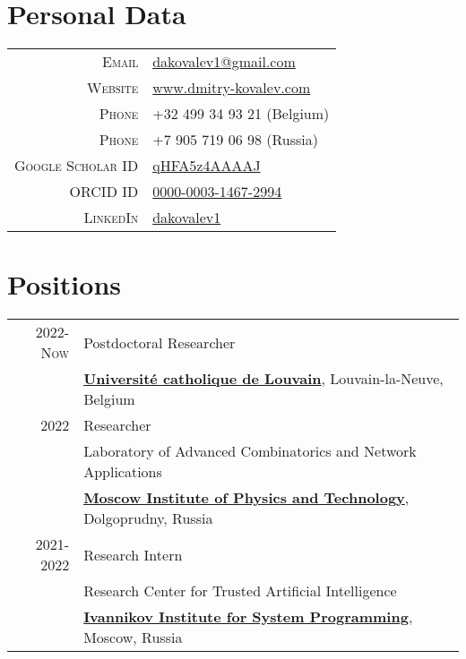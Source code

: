 \section{Personal Data}

\begin{tabular}{rl}
	\textsc{Email} & \href{mailto:dakovalev1@gmail.com}{dakovalev1@gmail.com}\\
	\textsc{Website} & \href{https://www.dmitry-kovalev.com}{www.dmitry-kovalev.com}\\
	\textsc{Phone} &  +32 499 34 93 21 (Belgium)\\
	\textsc{Phone} & +7 905 719 06 98 (Russia)\\
	\textsc{Google Scholar ID} &\href{https://scholar.google.com/citations?user=qHFA5z4AAAAJ}{qHFA5z4AAAAJ}\\
	\textsc{ORCID ID} & \href{https://orcid.org/0000-0003-1467-2994}{0000-0003-1467-2994}\\
	\textsc{LinkedIn} & \href{https://www.linkedin.com/in/dakovalev1/}{dakovalev1}

\end{tabular}



\section{Positions}
\begin{tabular}{rl}	
	\textsc{2022-Now}& Postdoctoral Researcher\\
	& \textbf{\href{https://uclouvain.be/en/index.html}{\color{black}Université catholique de Louvain}}, Louvain-la-Neuve, Belgium\\
	\textsc{2022}& Researcher\\
	&Laboratory of Advanced Combinatorics and Network Applications\\
	&\textbf{\href{https://mipt.ru/}{\color{black}Moscow Institute of Physics and Technology}}, Dolgoprudny, Russia\\
	\textsc{2021-2022}& Research Intern\\
	 &Research Center for Trusted Artificial Intelligence\\
	 &\textbf{\href{https://www.ispras.ru/en/}{\color{black}Ivannikov Institute for System Programming}}, Moscow, Russia
\end{tabular}


